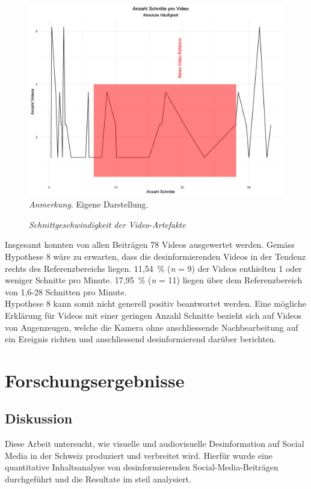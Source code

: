 \documentclass[12pt,a4paper]{article}        %
\begin{document}
\begin{figure}[H]
  \caption{\textit{Schnittgeschwindigkeit der Video-Artefakte}}
  \label{fig:video_cut_plot}
  \centering
  \includegraphics[width=1\linewidth]{images/video_cpm_plot.png}
  \footnotesize\textit{Anmerkung.} Eigene Darstellung.
\end{figure}

\pagebreak
Insgesamt konnten von allen Beiträgen 78 Videos ausgewertet werden. Gemäss Hypothese 8 wäre zu erwarten, dass die desinformierenden Videos in der Tendenz rechts des Referenzbereichs liegen. 11,54 \% (\textit{n} = 9) der Videos enthielten 1 oder weniger Schnitte pro Minute. 17,95 \% (\textit{n} = 11) liegen über dem Referenzbereich von 1,6-28 Schnitten pro Minute.\\
Hypothese 8 kann somit nicht generell positiv beantwortet werden. Eine mögliche Erklärung für Videos mit einer geringen Anzahl Schnitte bezieht sich auf Videos von Augenzeugen, welche die Kamera ohne anschliessende Nachbearbeitung auf ein Ereignis richten und anschliessend desinformierend darüber berichten.

\pagebreak
\section{Forschungsergebnisse}
\subsection{Diskussion}
Diese Arbeit untersucht, wie visuelle und audiovisuelle Desinformation auf Social Media in der Schweiz produziert und verbreitet wird. Hierfür wurde eine quantitative Inhaltsanalyse von desinformierenden Social-Media-Beiträgen durchgeführt und die Resultate im steil analysiert.
\end{document}
